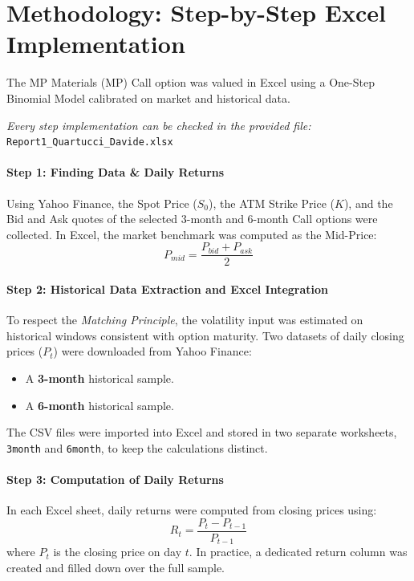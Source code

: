 \documentclass{report}
\begin{document}
\pagestyle{fancy}
\fancyhf{}
\renewcommand{\headrulewidth}{0.4pt}
\setlength{\headheight}{14pt}

\section{Methodology: Step-by-Step Excel Implementation}
The MP Materials (MP) Call option was valued in Excel using a One-Step Binomial Model calibrated on market and historical data.

\textit{Every step implementation can be checked in the provided file:} \texttt{Report1\_Quartucci\_Davide.xlsx}

\paragraph{Step 1: Finding Data \& Daily Returns}
Using Yahoo Finance, the Spot Price ($S_0$), the ATM Strike Price ($K$), and the Bid and Ask quotes of the selected 3-month and 6-month Call options were collected. In Excel, the market benchmark was computed as the Mid-Price:
$$P_{mid} = \frac{P_{bid} + P_{ask}}{2}$$

\paragraph{Step 2: Historical Data Extraction and Excel Integration}
To respect the \textit{Matching Principle}, the volatility input was estimated on historical windows consistent with option maturity. Two datasets of daily closing prices ($P_t$) were downloaded from Yahoo Finance:
\begin{itemize}
    \item A \textbf{3-month} historical sample.
    \item A \textbf{6-month} historical sample.
\end{itemize}

The CSV files were imported into Excel and stored in two separate worksheets, \texttt{3month} and \texttt{6month}, to keep the calculations distinct.

\paragraph{Step 3: Computation of Daily Returns}
In each Excel sheet, daily returns were computed from closing prices using:
$$R_t=\frac{P_t-P_{t-1}}{P_{t-1}}$$
where $P_t$ is the closing price on day $t$. In practice, a dedicated return column was created and filled down over the full sample.
\end{document}
